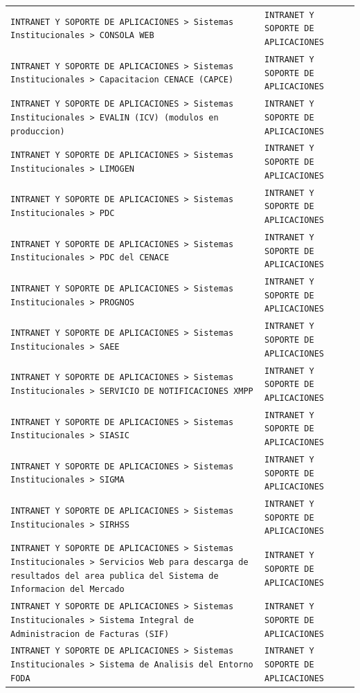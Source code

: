 \begin{longtable}{>{\raggedright\arraybackslash}p{} >{\raggedright\arraybackslash}p{}}
\texttt{INTRANET Y SOPORTE DE APLICACIONES > Sistemas Institucionales > CONSOLA WEB} & \texttt{INTRANET Y SOPORTE DE APLICACIONES} \\
\texttt{INTRANET Y SOPORTE DE APLICACIONES > Sistemas Institucionales > Capacitacion CENACE (CAPCE)} & \texttt{INTRANET Y SOPORTE DE APLICACIONES} \\
\texttt{INTRANET Y SOPORTE DE APLICACIONES > Sistemas Institucionales > EVALIN (ICV) (modulos en produccion)} & \texttt{INTRANET Y SOPORTE DE APLICACIONES} \\
\texttt{INTRANET Y SOPORTE DE APLICACIONES > Sistemas Institucionales > LIMOGEN} & \texttt{INTRANET Y SOPORTE DE APLICACIONES} \\
\texttt{INTRANET Y SOPORTE DE APLICACIONES > Sistemas Institucionales > PDC} & \texttt{INTRANET Y SOPORTE DE APLICACIONES} \\
\texttt{INTRANET Y SOPORTE DE APLICACIONES > Sistemas Institucionales > PDC del CENACE} & \texttt{INTRANET Y SOPORTE DE APLICACIONES} \\
\texttt{INTRANET Y SOPORTE DE APLICACIONES > Sistemas Institucionales > PROGNOS} & \texttt{INTRANET Y SOPORTE DE APLICACIONES} \\
\texttt{INTRANET Y SOPORTE DE APLICACIONES > Sistemas Institucionales > SAEE} & \texttt{INTRANET Y SOPORTE DE APLICACIONES} \\
\texttt{INTRANET Y SOPORTE DE APLICACIONES > Sistemas Institucionales > SERVICIO DE NOTIFICACIONES XMPP} & \texttt{INTRANET Y SOPORTE DE APLICACIONES} \\
\texttt{INTRANET Y SOPORTE DE APLICACIONES > Sistemas Institucionales > SIASIC} & \texttt{INTRANET Y SOPORTE DE APLICACIONES} \\
\texttt{INTRANET Y SOPORTE DE APLICACIONES > Sistemas Institucionales > SIGMA} & \texttt{INTRANET Y SOPORTE DE APLICACIONES} \\
\texttt{INTRANET Y SOPORTE DE APLICACIONES > Sistemas Institucionales > SIRHSS} & \texttt{INTRANET Y SOPORTE DE APLICACIONES} \\
\texttt{INTRANET Y SOPORTE DE APLICACIONES > Sistemas Institucionales > Servicios Web para descarga de resultados del area publica del Sistema de Informacion del Mercado} & \texttt{INTRANET Y SOPORTE DE APLICACIONES} \\
\texttt{INTRANET Y SOPORTE DE APLICACIONES > Sistemas Institucionales > Sistema Integral de Administracion de Facturas (SIF)} & \texttt{INTRANET Y SOPORTE DE APLICACIONES} \\
\texttt{INTRANET Y SOPORTE DE APLICACIONES > Sistemas Institucionales > Sistema de Analisis del Entorno FODA} & \texttt{INTRANET Y SOPORTE DE APLICACIONES} \\

\end{longtable}
